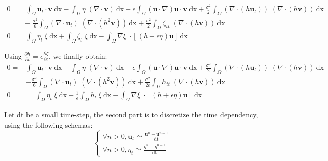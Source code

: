 \documentclass[11pt,a4paper]{article}
\begin{document}
\begin{equation}
			\begin{split}
0 &= \int_{\Omega} \! \mathbf{u}_t \cdot \mathbf{v} \: \mathrm{dx} - \int_{\Omega} \! \eta \; (\nabla \cdot \mathbf{v}) \: \mathrm{dx} + \epsilon \! \int_{\Omega} \! (\mathbf{u} \cdot \nabla ) \mathbf{u} \cdot \mathbf{v} \: \mathrm{dx} + \frac{\sigma^2}{2} \! \int_{\Omega} \!  (\nabla \cdot (h \mathbf{u}_t)) \; (\nabla \cdot (h \mathbf{v}) )\: \mathrm{dx} \\
&\quad - \frac{\sigma^2}{6} \! \int_{\Omega} \! (\nabla \cdot \mathbf{u}_t) \; (\nabla  \cdot (h^2  \mathbf{v})) \: \mathrm{dx} + \frac{\sigma^2}{2} \! \int_{\Omega} \!  \zeta_{tt}  \; (\nabla \cdot( h \mathbf{v})) \: \mathrm{dx}
\\
\displaystyle 0 &= \int_{\Omega}\! \eta_t \; \xi \: \mathrm{dx} +\int_{\Omega}\! \zeta_t \; \xi \: \mathrm{dx}
-\int_{\Omega}\! \nabla \xi \; \cdot [(h+\epsilon\eta) \mathbf{u}]  \: \mathrm{dx}
			\end{split} 
\end{equation}

Using $\displaystyle \frac{\partial h}{\partial t} = \epsilon \frac{\partial \zeta}{\partial t}$, we finally obtain: 
\begin{equation}
			\begin{split}
0 = &\int_{\Omega} \! \mathbf{u}_t \cdot \mathbf{v} \: \mathrm{dx} - \int_{\Omega} \! \eta \; (\nabla \cdot \mathbf{v}) \: \mathrm{dx} + \epsilon \! \int_{\Omega} \! (\mathbf{u} \cdot \nabla ) \mathbf{u} \cdot \mathbf{v} \: \mathrm{dx} + \frac{\sigma^2}{2} \! \int_{\Omega} \!  (\nabla \cdot (h \mathbf{u}_t)) \; (\nabla \cdot (h \mathbf{v}) )\: \mathrm{dx} \\
&- \frac{\sigma^2}{6} \! \int_{\Omega} \! (\nabla \cdot \mathbf{u}_t) \; (\nabla  \cdot (h^2  \mathbf{v})) \: \mathrm{dx} + \frac{\sigma^2}{2 \epsilon} \! \int_{\Omega} \!  h_{tt}  \; (\nabla \cdot( h \mathbf{v})) \: \mathrm{dx} 
\\
\displaystyle 0 &= \int_{\Omega}\! \eta_t \; \xi \: \mathrm{dx} +\frac{1}{\epsilon}\int_{\Omega}\! h_t \; \xi \: \mathrm{dx}
-\int_{\Omega}\! \nabla \xi \; \cdot [(h+\epsilon\eta) \mathbf{u}]  \: \mathrm{dx}
			\end{split}
\end{equation}

Let $\mathrm{dt}$ be a small time-step, the second part is to discretize the time dependency, using the following schemas:	
\begin{equation}
\left\lbrace
		\begin{array}{l}
\displaystyle \forall n > 0, \mathbf{u}_t \simeq \frac{\mathbf{u}^n - \mathbf{u}^{n-1}}{\mathrm{dt}}  \\
\displaystyle \forall n > 0, \eta_t \simeq \frac{\eta^n - \eta^{n-1}}{\mathrm{dt}}  
		\end{array}
	\right.
\end{equation}
\end{document}
